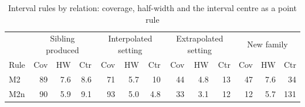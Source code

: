 \documentclass[pdflatex,sn-basic,lineno]{sn-jnl}
\newcommand{\tabsize}{\fontsize{8}{9.5}\selectfont}
\newcommand{\tabsizesmall}{\footnotesize}%
\providecommand{\DIFdelbegin}{} %
\providecommand{\DIFaddbeginFL}{} %
\providecommand{\DIFaddendFL}{} %
\providecommand{\DIFdelbeginFL}{} %
\providecommand{\DIFdelendFL}{} %
\newcommand{\DIFscaledelfig}{0.5}
\newlength{\DIFdelgraphicswidth} %
\newlength{\DIFdelgraphicsheight} %
\newcommand{\DIFaddincludegraphics}[2][]{{\color{blue}\fbox{\DIFOincludegraphics[#1]{#2}}}} %
\newcommand{\DIFdelincludegraphics}[2][]{%
\sbox{\DIFdelgraphicsbox}{\DIFOincludegraphics[#1]{#2}}%
\settoboxwidth{\DIFdelgraphicswidth}{\DIFdelgraphicsbox} %
\settoboxtotalheight{\DIFdelgraphicsheight}{\DIFdelgraphicsbox} %
\scalebox{\DIFscaledelfig}{%
\parbox[b]{\DIFdelgraphicswidth}{\usebox{\DIFdelgraphicsbox}\\[-\baselineskip] \rule{\DIFdelgraphicswidth}{0em}}\llap{\resizebox{\DIFdelgraphicswidth}{\DIFdelgraphicsheight}{%
\setlength{\unitlength}{\DIFdelgraphicswidth}%
\begin{picture}(1,1)%
\thicklines\linethickness{2pt} %
{\color[rgb]{1,0,0}\put(0,0){\framebox(1,1){}}}%
{\color[rgb]{1,0,0}\put(0,0){\line( 1,1){1}}}%
{\color[rgb]{1,0,0}\put(0,1){\line(1,-1){1}}}%
\end{picture}%
}\hspace*{3pt}}} %
} %
\DeclareRobustCommand{\DIFdelbegin}{\DIFOdelbegin \let\includegraphics\DIFdelincludegraphics} %
\DeclareRobustCommand{\DIFaddbeginFL}{\DIFOaddbeginFL \let\includegraphics\DIFaddincludegraphics} %
\DeclareRobustCommand{\DIFaddendFL}{\DIFOaddendFL \let\includegraphics\DIFOincludegraphics} %
\DeclareRobustCommand{\DIFdelbeginFL}{\DIFOdelbeginFL \let\includegraphics\DIFdelincludegraphics} %
\DeclareRobustCommand{\DIFdelendFL}{\DIFOaddendFL \let\includegraphics\DIFOincludegraphics} %
\begin{document}
\begin{appendices}
\DIFdelbegin %
\DIFdelendFL \DIFaddbeginFL \begin{table}[p]
\tabsizesmall
\DIFaddendFL \setlength{\tabcolsep}{2.6pt}
\caption{Interval rules by relation: coverage, half-width and the interval centre as a point rule}\label{tab:intervals}
\DIFdelbeginFL %
\DIFdelendFL \DIFaddbeginFL \begin{tabular*}{\textwidth}{@{\extracolsep{\fill}}lrrrrrrrrrrrr@{}}
\toprule
 & \multicolumn{3}{c}{Sibling produced} & \multicolumn{3}{c}{Interpolated setting} & \multicolumn{3}{c}{Extrapolated setting} & \multicolumn{3}{c}{New family} \\
\cmidrule(lr){2-4}\cmidrule(lr){5-7}\cmidrule(lr){8-10}\cmidrule(lr){11-13}
Rule & Cov & HW & Ctr & Cov & HW & Ctr & Cov & HW & Ctr & Cov & HW & Ctr \\
\midrule
M2 & 89 & 7.6 & 8.6 & 71 & 5.7 & 10 & 44 & 4.8 & 13 & 47 & 7.6 & 34 \\
M2n & 90 & 5.9 & 9.1 & 93 & 5.0 & 4.8 & 33 & 3.1 & 12 & 12 & 5.7 & 131 \\

\end{tabular*}
\end{table}
\end{appendices}
\end{document}
